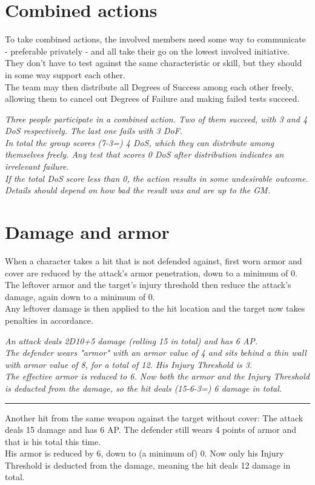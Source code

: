 \section{Combined actions}
\label{combinedaction}
To take combined actions, the involved members need some way to communicate - preferable privately - and all take their go on the lowest involved initiative. They don't have to test against the same characteristic or skill, but they should in some way support each other.\\
The team may then distribute all Degrees of Success among each other freely, allowing them to cancel out Degrees of Failure and making failed tests succeed.
\begin{exampleblock}
	\itshape
	Three people participate in a combined action. Two of them succeed, with 3 and 4 DoS respectively. The last one fails with 3 DoF.\\
	In total the group scores (7-3=) 4 DoS,
		which they can distribute among themselves freely.
	Any test that scores 0 DoS after distribution indicates an irrelevant failure.
	\\%
	If the total DoS score less than 0,
		the action results in some undesirable outcome.
	Details should depend on how bad the result was
		and are up to the GM.
\end{exampleblock}
\section{Damage and armor}
When a character takes a hit that is not defended against, first worn armor and cover are reduced by the attack's armor penetration, down to a minimum of 0. \\
The leftover armor and the target’s injury threshold then reduce the attack’s damage, again down to a minimum of 0. \\
Any leftover damage is then applied to the hit location
	and the target now takes penalties in accordance.
\begin{exampleblock}
	\itshape
	An attack deals 2D10+5 damage (rolling 15 in total) and has 6 AP.\\
	The defender wears "armor" with an armor value of 4 and sits behind a thin wall with armor value of 8, for a total of 12. His Injury Threshold is 3.\\
	The effective armor is reduced to 6. Now both the armor and the Injury Threshold is deducted from the damage, so the hit deals (15-6-3=) 6 damage in total.
	\par
	\hrule
	Another hit from the same weapon against the target without cover:
	The attack deals 15 damage and has 6 AP.
	The defender still wears 4 points of armor and that is his total this time.
	\\%
	His armor is reduced by 6, down to (a minimum of) 0.
	Now only his Injury Threshold is deducted from the damage,
		meaning the hit deals 12 damage in total.
\end{exampleblock}
